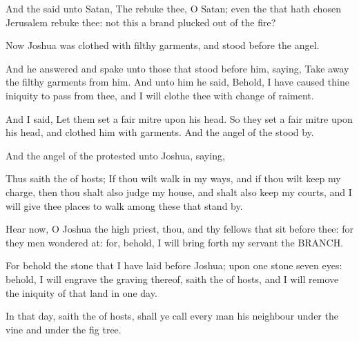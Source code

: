 {And the
{}
said unto
Satan, The
{}
rebuke thee, O
Satan; even the
{} that hath
chosen
Jerusalem
rebuke thee:
{} not this a
brand
plucked out of the
fire?

Now
Joshua was
clothed with
filthy
garments, and
stood
before the
angel.

And he
answered and
spake unto those that
stood
before him,
saying, Take
away the
filthy
garments from him. And unto him he
said,
Behold, I have caused thine
iniquity to
pass from thee, and I will
clothe thee with change of
raiment.

And I
said, Let them
set a
fair
mitre upon his
head. So they
set a
fair
mitre upon his
head, and
clothed him with
garments. And the
angel of the
{} stood
by.

And the
angel of the
{}
protested unto
Joshua,
saying,

Thus
saith the
{} of
hosts; If thou wilt
walk in my
ways, and if thou wilt
keep my
charge, then thou shalt also
judge my
house, and shalt also
keep my
courts, and I will
give thee places to
walk among these that stand
by.


\par }{\PP {}Hear now, O
Joshua the
high
priest, thou, and thy
fellows that
sit
before thee: for they
{}
men wondered
at: for, behold, I will bring
forth my
servant the
BRANCH.

For behold the
stone that I have
laid
before
Joshua; upon
one
stone
{}
seven
eyes: behold, I will
engrave the
graving thereof,
saith the
{} of
hosts, and I will
remove the
iniquity of that
land in
one
day.

In that
day,
saith the
{} of
hosts, shall ye
call every
man his
neighbour under the
vine and under the fig
tree.




\par }

